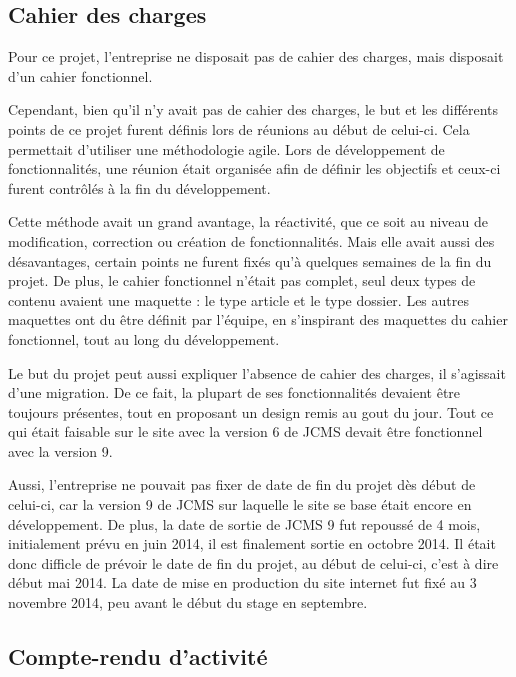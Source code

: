 \documentclass[12pt,a4paper]{article}
\begin{document}
\subsection{Cahier des charges}
Pour ce projet, l'entreprise ne disposait pas de cahier des charges, mais disposait d'un cahier fonctionnel.\par
Cependant, bien qu'il n'y avait pas de cahier des charges, le but et les différents points de ce projet furent définis lors de réunions au début de celui-ci. Cela permettait d'utiliser une méthodologie agile. Lors de développement de fonctionnalités, une réunion était organisée afin de définir les objectifs et ceux-ci furent contrôlés à la fin du développement.\par 
Cette méthode avait un grand avantage, la réactivité, que ce soit au niveau de modification, correction ou création de fonctionnalités. Mais elle avait aussi des désavantages, certain points ne furent fixés qu'à quelques semaines de la fin du projet. De plus, le cahier fonctionnel n'était pas complet, seul deux types de contenu avaient une maquette : le type article et le type dossier. Les autres maquettes ont du être définit par l'équipe, en s'inspirant des maquettes du cahier fonctionnel, tout au long du développement. \par 
Le but du projet peut aussi expliquer l'absence de cahier des charges, il s'agissait d'une migration. De ce fait, la plupart de ses fonctionnalités devaient être toujours présentes, tout en proposant un design remis au gout du jour. Tout ce qui était faisable sur le site avec la version 6 de \gls{JCMS} devait être fonctionnel avec la version 9.\par 
Aussi, l'entreprise ne pouvait pas fixer de date de fin du projet dès début de celui-ci, car la version 9 de \gls{JCMS} sur laquelle le site se base était encore en développement. De plus, la date de sortie de \gls{JCMS} 9 fut repoussé de 4 mois, initialement prévu en juin 2014, il est finalement sortie en octobre 2014. Il était donc difficle de prévoir le date de fin du projet, au début de celui-ci, c'est à dire début mai 2014. La date de mise en production du site internet fut fixé au 3 novembre 2014, peu avant le début du stage en septembre.\par
\subsection{Compte-rendu d'activité}
\end{document}
